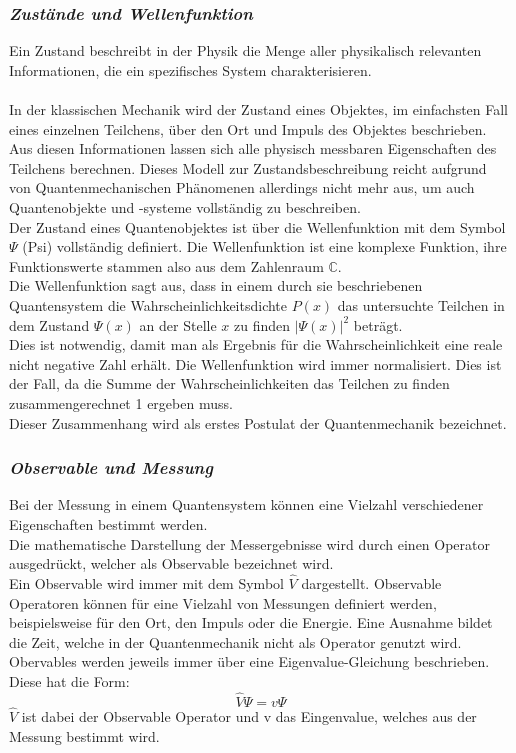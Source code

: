 \subsubsection*{\textit{Zustände und Wellenfunktion}}

Ein Zustand beschreibt in der Physik die Menge aller physikalisch relevanten Informationen, die ein spezifisches System charakterisieren.\\
\\
In der klassischen Mechanik wird der Zustand eines Objektes, im einfachsten Fall eines einzelnen Teilchens, über den Ort und Impuls des Objektes beschrieben. Aus diesen Informationen lassen sich alle physisch messbaren Eigenschaften des Teilchens berechnen. Dieses Modell zur Zustandsbeschreibung reicht aufgrund von Quantenmechanischen Phänomenen allerdings nicht mehr aus, um auch Quantenobjekte und -systeme vollständig zu beschreiben.\\

Der Zustand eines Quantenobjektes ist über die Wellenfunktion mit dem Symbol $\Psi$ (Psi) vollständig definiert. Die Wellenfunktion ist eine komplexe Funktion, ihre Funktionswerte stammen also aus dem Zahlenraum $\mathbb{C}$.\\
Die Wellenfunktion sagt aus, dass in einem durch sie beschriebenen Quantensystem die Wahrscheinlichkeitsdichte $P(x)$ das untersuchte Teilchen in dem Zustand $\Psi(x)$ an der Stelle $x$ zu finden $|\Psi(x)|^2$ beträgt.\\
Dies ist notwendig, damit man als Ergebnis für die Wahrscheinlichkeit eine reale nicht negative Zahl erhält. Die Wellenfunktion wird immer normalisiert. Dies ist der Fall, da die Summe der Wahrscheinlichkeiten das Teilchen zu finden zusammengerechnet 1 ergeben muss.\\
Dieser Zusammenhang wird als erstes Postulat der Quantenmechanik bezeichnet.

\subsubsection*{\textit{Observable und Messung}}

Bei der Messung in einem Quantensystem können eine Vielzahl verschiedener Eigenschaften bestimmt werden.\\
Die mathematische Darstellung der Messergebnisse  wird  durch einen Operator ausgedrückt, welcher als Observable bezeichnet wird.\\
Ein Observable wird immer mit dem Symbol $\hat{V}$ dargestellt.
Observable Operatoren können für eine Vielzahl von Messungen definiert werden, beispielsweise für den Ort, den Impuls oder die Energie. Eine Ausnahme bildet die Zeit, welche in der Quantenmechanik nicht als Operator genutzt wird.\\
Obervables werden jeweils immer über eine Eigenvalue-Gleichung beschrieben. Diese hat die Form:
\begin{equation*}
\hat{V} \Psi = v \Psi
\end{equation*}
$\hat{V}$ ist dabei der Observable Operator und v das Eingenvalue, welches aus der Messung bestimmt wird.

